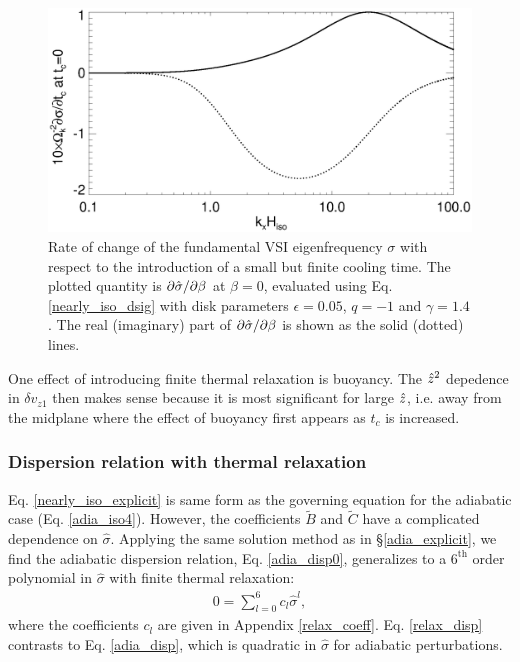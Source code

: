 \begin{figure}
  \includegraphics[width=\linewidth]{figures/domegadbeta}
  \caption{Rate of change of the fundamental VSI eigenfrequency
    $\sigma$ with respect to the introduction of a small but finite
    cooling time. The plotted quantity is $\partial\hat{\sigma}/\partial\beta$ at $\beta=0$, evaluated using
    Eq. \ref{nearly_iso_dsig} with 
    disk parameters $\epsilon=0.05$, $q=-1$ and $\gamma=1.4$. The real
    (imaginary) part of $\partial\hat{\sigma}/\partial\beta$ is shown as the solid
    (dotted) lines. 
    \label{domegadbeta}}  
\end{figure}   

One effect of introducing finite thermal relaxation is buoyancy. %
The $\hat{z}^2$ depedence in $\delta v_{z1}$ then makes sense because it
is most significant for large $\hat{z}$, i.e. away from the midplane
where the effect of buoyancy first appears as $t_c$ is increased. 

\subsubsection{Dispersion relation with thermal relaxation}\label{disp_relax}
Eq. \ref{nearly_iso_explicit} is same form
as the governing equation for the adiabatic case
(Eq. \ref{adia_iso4}). However, the coefficients $\widetilde{B}$ and $\widetilde{C}$
have a complicated dependence on $\hat{\sigma}$. 
Applying the same solution method as in \S\ref{adia_explicit}, we 
find the adiabatic dispersion relation,
Eq. \ref{adia_disp0}, generalizes to a $6^\mathrm{th}$ order
polynomial in $\hat{\sigma}$ with finite thermal relaxation:
\begin{align}
  0 = \sum_{l=0}^{6}c_l\hat{\sigma}^l,\label{relax_disp}
\end{align}
where the coefficients $c_l$ are given in Appendix \ref{relax_coeff}.
Eq. \ref{relax_disp} contrasts to Eq. \ref{adia_disp}, which is
quadratic in $\hat{\sigma}$ for adiabatic perturbations. 

